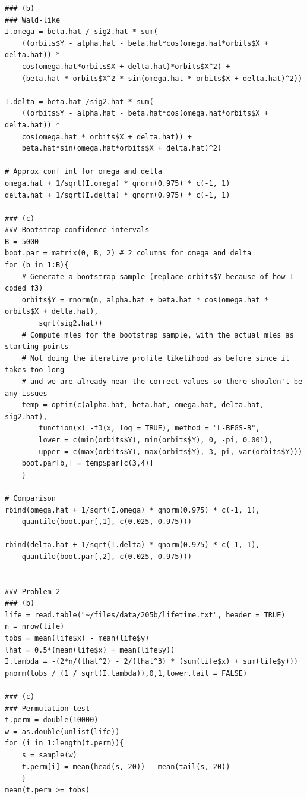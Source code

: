 \documentclass[12pt]{article}
\begin{document}
\begin{tiny}
\begin{verbatim}
### (b)
### Wald-like
I.omega = beta.hat / sig2.hat * sum(
    ((orbits$Y - alpha.hat - beta.hat*cos(omega.hat*orbits$X + delta.hat)) *
    cos(omega.hat*orbits$X + delta.hat)*orbits$X^2) +
    (beta.hat * orbits$X^2 * sin(omega.hat * orbits$X + delta.hat)^2))

I.delta = beta.hat /sig2.hat * sum(
    ((orbits$Y - alpha.hat - beta.hat*cos(omega.hat*orbits$X + delta.hat)) *
    cos(omega.hat * orbits$X + delta.hat)) +
    beta.hat*sin(omega.hat*orbits$X + delta.hat)^2)

# Approx conf int for omega and delta
omega.hat + 1/sqrt(I.omega) * qnorm(0.975) * c(-1, 1)
delta.hat + 1/sqrt(I.delta) * qnorm(0.975) * c(-1, 1)

### (c)
### Bootstrap confidence intervals
B = 5000
boot.par = matrix(0, B, 2) # 2 columns for omega and delta
for (b in 1:B){
    # Generate a bootstrap sample (replace orbits$Y because of how I coded f3)
    orbits$Y = rnorm(n, alpha.hat + beta.hat * cos(omega.hat * orbits$X + delta.hat),
        sqrt(sig2.hat))
    # Compute mles for the bootstrap sample, with the actual mles as starting points
    # Not doing the iterative profile likelihood as before since it takes too long
    # and we are already near the correct values so there shouldn't be any issues
    temp = optim(c(alpha.hat, beta.hat, omega.hat, delta.hat, sig2.hat),
        function(x) -f3(x, log = TRUE), method = "L-BFGS-B",
        lower = c(min(orbits$Y), min(orbits$Y), 0, -pi, 0.001),
        upper = c(max(orbits$Y), max(orbits$Y), 3, pi, var(orbits$Y)))
    boot.par[b,] = temp$par[c(3,4)]
    }

# Comparison
rbind(omega.hat + 1/sqrt(I.omega) * qnorm(0.975) * c(-1, 1),
    quantile(boot.par[,1], c(0.025, 0.975)))

rbind(delta.hat + 1/sqrt(I.delta) * qnorm(0.975) * c(-1, 1),
    quantile(boot.par[,2], c(0.025, 0.975)))


### Problem 2
### (b)
life = read.table("~/files/data/205b/lifetime.txt", header = TRUE)
n = nrow(life)
tobs = mean(life$x) - mean(life$y)
lhat = 0.5*(mean(life$x) + mean(life$y))
I.lambda = -(2*n/(lhat^2) - 2/(lhat^3) * (sum(life$x) + sum(life$y)))
pnorm(tobs / (1 / sqrt(I.lambda)),0,1,lower.tail = FALSE)

### (c)
### Permutation test
t.perm = double(10000)
w = as.double(unlist(life))
for (i in 1:length(t.perm)){
    s = sample(w)
    t.perm[i] = mean(head(s, 20)) - mean(tail(s, 20))
    }
mean(t.perm >= tobs)
\end{verbatim}
\end{tiny}
\end{document}
